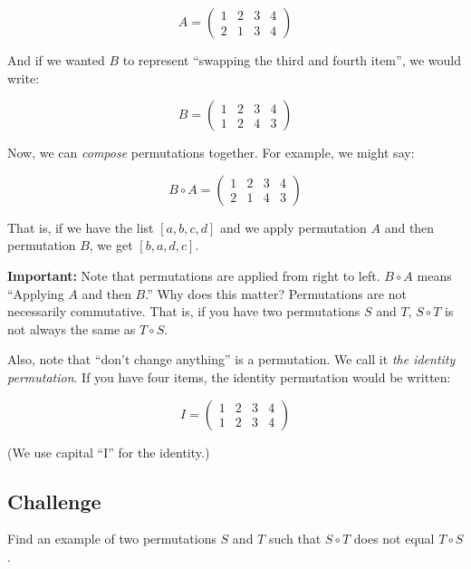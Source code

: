 $$A = \begin{pmatrix}
  1 & 2 & 3 & 4 \\
  2 & 1 & 3 & 4
\end{pmatrix}$$

And if we wanted $B$ to represent ``swapping the third and fourth item'', we would write:

$$B = \begin{pmatrix}                                                                                                                             
  1 & 2 & 3 & 4 \\                                                                                                                                
  1 & 2 & 4 & 3
\end{pmatrix}$$

Now, we can \textit{compose} permutations together. For example, we might say:

$$B \circ A = \begin{pmatrix}
  1 & 2 & 3 & 4 \\
  2 & 1 & 4 & 3
\end{pmatrix}$$

That is, if we have the list $[a, b, c, d]$ and we apply permutation $A$ and then permutation $B$, we get $[b, a, d, c]$.

\textbf{Important:} Note that permutations are applied from right to
left. $B \circ A$ means ``Applying $A$ and then $B$.''  Why does this matter?
Permutations are not necessarily commutative. That is, if you have two
permutations $S$ and $T$, $S \circ T$ is not always the same as $T
\circ S$.

Also, note that ``don't change anything'' is a permutation. We call it
\textit{the identity permutation}. If you have four items, the identity
permutation would be written:

$$I = \begin{pmatrix}
  1 & 2 & 3 & 4 \\
  1 & 2 & 3 & 4
\end{pmatrix}$$

(We use capital ``I'' for the identity.)

\subsection{Challenge} Find an example of two permutations $S$ and $T$ such that $S \circ T$ does not equal $T \circ S$.

